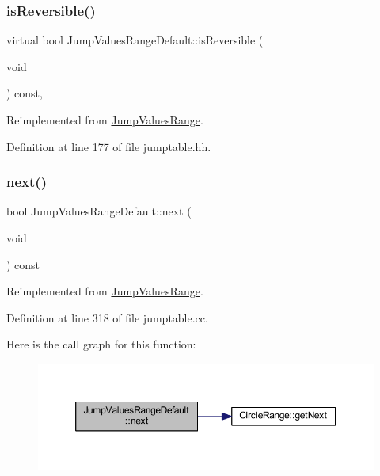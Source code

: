 \subsubsection{\texorpdfstring{isReversible()}{isReversible()}}
{\footnotesize\ttfamily virtual bool Jump\+Values\+Range\+Default\+::is\+Reversible (\begin{DoxyParamCaption}\item[{void}]{ }\end{DoxyParamCaption}) const\hspace{0.3cm}{\ttfamily [inline]}, {\ttfamily [virtual]}}



Reimplemented from \mbox{\hyperlink{class_jump_values_range_adeedbb8db9a84ff0422e61dcb76848fe}{Jump\+Values\+Range}}.



Definition at line 177 of file jumptable.\+hh.

\mbox{\label{class_jump_values_range_default_a1edd06eae7c959fc1b48865fe1bf342d}} 
\subsubsection{\texorpdfstring{next()}{next()}}
{\footnotesize\ttfamily bool Jump\+Values\+Range\+Default\+::next (\begin{DoxyParamCaption}\item[{void}]{ }\end{DoxyParamCaption}) const\hspace{0.3cm}{\ttfamily [virtual]}}



Reimplemented from \mbox{\hyperlink{class_jump_values_range_a1738552386fc802eaf6326a439c66bba}{Jump\+Values\+Range}}.



Definition at line 318 of file jumptable.\+cc.

Here is the call graph for this function\+:
\nopagebreak
\begin{figure}[H]
\begin{center}
\leavevmode
\includegraphics[width=350pt]{class_jump_values_range_default_a1edd06eae7c959fc1b48865fe1bf342d_cgraph}
\end{center}
\end{figure}
\mbox{\label{class_jump_values_range_default_ac55d86f4a33284589ff52333c69c9980}} 
